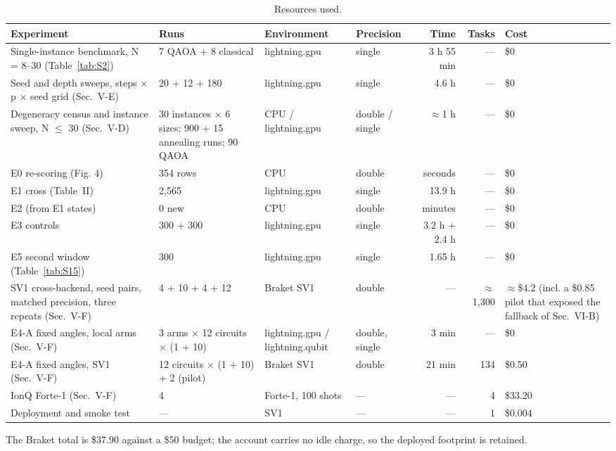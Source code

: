 \documentclass[journal]{IEEEtran}
\begin{document}
\begin{table}[!t]
\centering
\scriptsize
\caption{Resources used.}
\label{tab:S33}
\begin{tabular}{p{}p{}p{}p{}rrp{}}
\toprule
Experiment & Runs & Environment & Precision & Time & Tasks & Cost \\
\midrule
Single-instance benchmark, N = 8--30 (Table~\ref{tab:S2}) & 7 QAOA + 8 classical & lightning.gpu & single & 3 h 55 min & --- & \$0 \\
Seed and depth sweeps, steps $\times$ p $\times$ seed grid (Sec.~V-E) & 20 + 12 + 180 & lightning.gpu & single & 4.6 h & --- & \$0 \\
Degeneracy census and instance sweep, N $\leq$ 30 (Sec.~V-D) & 30 instances $\times$ 6 sizes; 900 + 15 annealing runs; 90 QAOA & CPU / lightning.gpu & double / single & $\approx$1 h & --- & \$0 \\
E0 re-scoring (Fig. 4) & 354 rows & CPU & double & seconds & --- & \$0 \\
E1 cross (Table~II) & 2,565 & lightning.gpu & single & 13.9 h & --- & \$0 \\
E2 (from E1 states) & 0 new & CPU & double & minutes & --- & \$0 \\
E3 controls & 300 + 300 & lightning.gpu & single & 3.2 h + 2.4 h & --- & \$0 \\
E5 second window (Table~\ref{tab:S15}) & 300 & lightning.gpu & single & 1.65 h & --- & \$0 \\
SV1 cross-backend, seed pairs, matched precision, three repeats (Sec.~V-F) & 4 + 10 + 4 + 12 & Braket SV1 & double & --- & $\approx$1,300 & $\approx$\$4.2 (incl. a \$0.85 pilot that exposed the fallback of Sec.~VI-B) \\
E4-A fixed angles, local arms (Sec.~V-F) & 3 arms $\times$ 12 circuits $\times$ (1 + 10) & lightning.gpu / lightning.qubit & double, single & 3 min & --- & \$0 \\
E4-A fixed angles, SV1 (Sec.~V-F) & 12 circuits $\times$ (1 + 10) + 2 (pilot) & Braket SV1 & double & 21 min & 134 & \$0.50 \\
IonQ Forte-1 (Sec.~V-F) & 4 & Forte-1, 100 shots & --- & --- & 4 & \$33.20 \\
Deployment and smoke test & --- & SV1 & --- & --- & 1 & \$0.004 \\
\bottomrule
\end{tabular}
\end{table}


The Braket total is \$37.90 against a \$50 budget; the account carries no idle charge, so the deployed footprint is retained.
\end{document}
